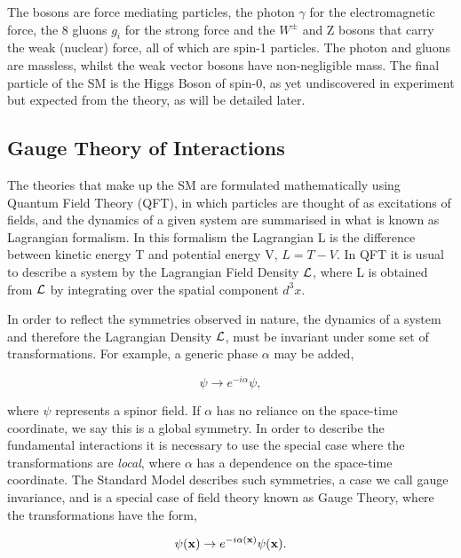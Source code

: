 The bosons are force mediating particles, the photon $\gamma$ for the electromagnetic force, the 8 gluons $g_{i}$ for the strong force and the $W^{\pm}$ and Z bosons that carry the weak (nuclear) force, all of which are spin-1 particles. The photon and gluons are massless, whilst the weak vector bosons have non-negligible mass. The final particle of the SM is the Higgs Boson of spin-0, as yet undiscovered in experiment but expected from the theory, as will be detailed later. 

\subsection{Gauge Theory of Interactions}

The theories that make up the SM are formulated mathematically using Quantum Field Theory (QFT), in which particles are thought of as excitations of fields, and the dynamics of a given system are summarised in what is known as Lagrangian formalism. In this formalism the Lagrangian L is the difference between kinetic energy T and potential energy V, $L = T - V$. In QFT it is usual to describe a system by the Lagrangian Field Density ${\mathcal{L}}$, where L is obtained from ${\mathcal{L}}$ by integrating over the spatial component $d^{3}x$.


In order to reflect the symmetries observed in nature, the dynamics of a system and therefore the Lagrangian Density ${\mathcal{L}}$, must be invariant under some set of transformations. For example, a generic phase $\alpha$ may be added,

\begin{equation}
\psi \rightarrow e^{-i\alpha}\psi, 
\label{GlobalTrans}
\end{equation}


where $\psi$ represents a spinor field. If $\alpha$ has no reliance on the space-time coordinate, we say this is a global symmetry. In order to describe the fundamental interactions it is necessary to use the special case where the transformations are \textit{local}, where $\alpha$ has a dependence on the space-time coordinate. The Standard Model describes such symmetries, a case we call gauge invariance, and is a special case of field theory known as Gauge Theory, where the transformations have the form, 


\begin{equation}
\psi(\mathbf{x}) \rightarrow e^{-i\alpha(\mathbf{x})}\psi (\mathbf{x}).
\label{LocalTrans}
\end{equation}


